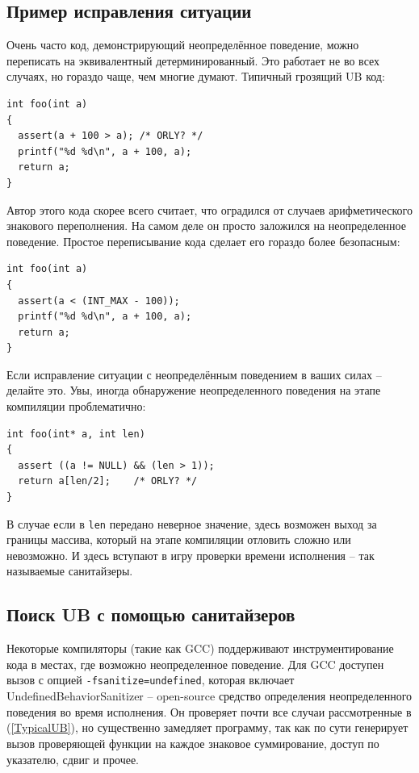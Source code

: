 \documentclass[a4paper,12pt,oneside]{book}
\begin{document}
\subsection{Пример исправления ситуации}\label{CorrectingUB}

Очень часто код, демонстрирующий неопределённое поведение, можно переписать на эквивалентный детерминированный. Это работает не во всех случаях, но гораздо чаще, чем многие думают. Типичный грозящий UB код:

\begin{lstlisting}
int foo(int a) 
{
  assert(a + 100 > a); /* ORLY? */
  printf("%d %d\n", a + 100, a);
  return a;
}
\end{lstlisting}

Автор этого кода скорее всего считает, что оградился от случаев арифметического знакового переполнения. На самом деле он просто заложился на неопределенное поведение. Простое переписывание кода сделает его гораздо более безопасным:

\begin{lstlisting}
int foo(int a) 
{
  assert(a < (INT_MAX - 100));
  printf("%d %d\n", a + 100, a);
  return a;
}
\end{lstlisting}

Если исправление ситуации с неопределённым поведением в ваших силах -- делайте это. Увы, иногда обнаружение неопределенного поведения на этапе компиляции проблематично:

\begin{lstlisting}
int foo(int* a, int len) 
{
  assert ((a != NULL) && (len > 1));
  return a[len/2];    /* ORLY? */
}
\end{lstlisting}

В случае если в \lstinline!len! передано неверное значение, здесь возможен выход за границы массива, который на этапе компиляции отловить сложно или невозможно. И здесь вступают в игру проверки времени исполнения -- так называемые санитайзеры.

\subsection{Поиск UB с помощью санитайзеров}\label{SanitizerUsage}

Некоторые компиляторы (такие как GCC) поддерживают инструментирование кода в местах, где возможно неопределенное поведение. Для GCC доступен вызов с опцией \lstinline!-fsanitize=undefined!, которая включает UndefinedBehaviorSanitizer -- open-source средство определения неопределенного поведения во время исполнения. Он проверяет почти все случаи рассмотренные в (\ref{TypicalUB}), но существенно замедляет программу, так как по сути генерирует вызов проверяющей функции на каждое знаковое суммирование, доступ по указателю, сдвиг и прочее.
\end{document}
